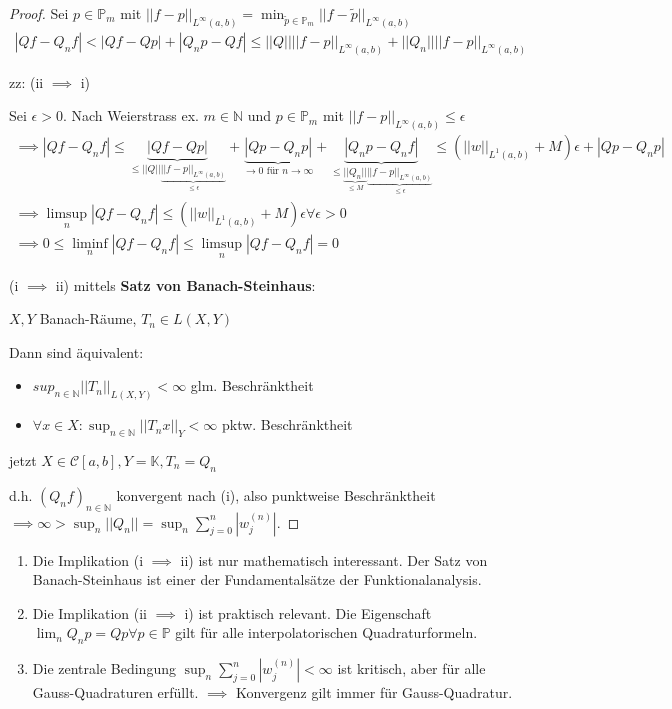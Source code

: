 \begin{proof}
	Sei $p \in \mathbb{P}_m$ mit $||f-p||_{L^\infty(a,b)} = \min_{\tilde{p} \in \mathbb{P}_m} ||f-\tilde{p}||_{L^\infty(a,b)}$
	\begin{align*}
		|Qf - Q_nf| < |Qf - Qp| + |Q_np - Qf| \leq ||Q|| ||f-p||_{L^\infty(a,b)} + ||Q_n|| ||f-p||_{L^\infty(a,b)}
	\end{align*}
	
	zz: (ii $\implies$ i)
	
	Sei $\epsilon > 0$. Nach Weierstrass ex. $m \in \mathbb{N}$ und $p \in \mathbb{P}_m$ mit $||f-p||_{L^\infty(a,b)} \leq \epsilon$
	\begin{align*}
		\implies |Qf - Q_nf| \leq \underbrace{|Qf - Qp|}_{\leq ||Q|| \underbrace{||f-p||_{L^\infty(a,b)}}_{\leq \epsilon}} + \underbrace{|Qp - Q_np|}_{\rightarrow 0 \text{ für } n\rightarrow\infty} + \underbrace{|Q_np - Q_nf|}_{\leq \underbrace{||Q_n||}_{\leq M} \underbrace{||f-p||_{L^\infty(a,b)}}_{\leq \epsilon}} \leq
		(||w||_{L^1(a,b)} + M)\epsilon + |Qp - Q_np|\\
		\implies \limsup_n |Qf - Q_nf| \leq (||w||_{L^1(a,b)} + M) \epsilon \forall \epsilon > 0\\
		\implies 0 \leq \liminf_n |Qf - Q_nf| \leq \limsup_n |Qf - Q_nf| = 0
	\end{align*}
	
	(i $\implies$ ii) mittels \textbf{Satz von Banach-Steinhaus}:
	
	$X, Y$ Banach-Räume, $T_n \in L(X,Y)$
	
	Dann sind äquivalent:
	\begin{itemize}
		\item $sup_{n \in \mathbb{N}} ||T_n||_{L(X,Y)} < \infty$ glm. Beschränktheit
		\item $\forall x \in X: \sup_{n\in\mathbb{N}} ||T_nx||_Y < \infty$ pktw. Beschränktheit
	\end{itemize}
	jetzt $X \in \mathcal{C}[a,b], Y=\mathbb{K}, T_n=Q_n$
	
	d.h. $(Q_nf)_{n\in\mathbb{N}}$ konvergent nach (i), also punktweise Beschränktheit $\implies \infty > \sup_n ||Q_n|| = \sup_n \sum_{j=0}^{n} |w_j^{(n)}|$.
\end{proof}

\begin{remark}
	\begin{enumerate}
		\item Die Implikation (i $\implies$ ii) ist nur mathematisch interessant. Der Satz von Banach-Steinhaus ist einer der Fundamentalsätze der Funktionalanalysis.
		\item Die Implikation (ii $\implies$ i) ist praktisch relevant. Die Eigenschaft $\lim_n Q_n p = Qp \forall p \in \mathbb{P}$ gilt für alle interpolatorischen Quadraturformeln.
		\item Die zentrale Bedingung $\sup_n \sum_{j=0}^{n} |w_j^{(n)}| < \infty$ ist kritisch, aber für alle Gauss-Quadraturen erfüllt. $\implies$ Konvergenz gilt immer für Gauss-Quadratur.
	\end{enumerate}
\end{remark}


